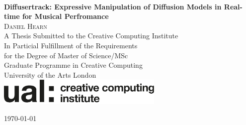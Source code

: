 \begin{titlepage}

\begin{center}

~\\[1.5cm]
{ \Large \bfseries Diffusertrack: Expressive Manipulation of Diffusion Models in Real-time for Musical Perfromance}\\[2.5cm]



{\large
\textsc{Daniel Hearn}\\[3.5cm]

A Thesis Submitted to the Creative Computing Institute\\In Particial Fulfillment of the Requirements\\for the Degree of Master of Science/MSc
\\[0.5cm]

Graduate Programme in Creative Computing\\[0.5cm]

University of the Arts London\\[2.0cm]

\includegraphics[width=0.6\textwidth]{figs/global/cci.png}\\[1cm]

}

\vfill

{\today}

\end{center}

\end{titlepage}



\pagebreak
